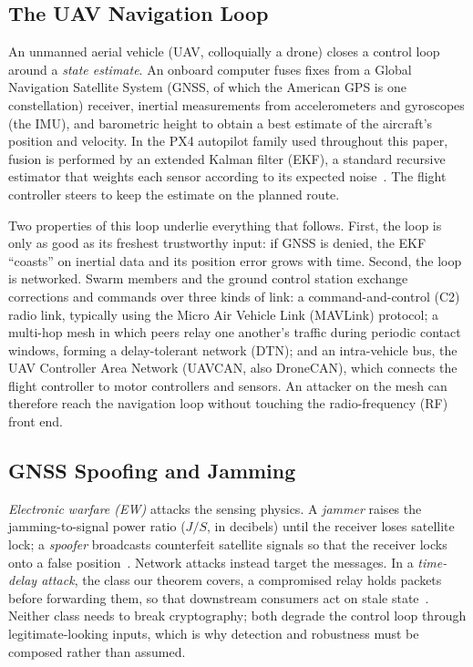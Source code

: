 \subsection{The UAV Navigation Loop}
An unmanned aerial vehicle (UAV, colloquially a drone) closes a control loop
around a \emph{state estimate}. An onboard computer fuses fixes from a Global
Navigation Satellite System (GNSS, of which the American GPS is one
constellation) receiver, inertial measurements from accelerometers and
gyroscopes (the IMU), and barometric height to obtain a best estimate of the
aircraft's position and velocity. In the PX4 autopilot family used throughout
this paper, fusion is performed by an extended Kalman filter (EKF), a standard
recursive estimator that weights each sensor according to its expected
noise~\cite{kong2024px4ekf}. The flight controller steers to keep the
estimate on the planned route.

Two properties of this loop underlie everything that follows. First, the loop is
only as good as its freshest trustworthy input: if GNSS is denied, the EKF
``coasts'' on inertial data and its position error grows with time. Second, the
loop is networked. Swarm members and the ground control station exchange
corrections and commands over three kinds of link: a command-and-control (C2) radio link,
typically using the Micro Air Vehicle Link (MAVLink) protocol; a multi-hop mesh
in which peers relay one another's traffic during periodic contact windows,
forming a delay-tolerant network (DTN); and an intra-vehicle bus, the UAV
Controller Area Network (UAVCAN, also DroneCAN), which connects the flight
controller to motor controllers and sensors. An attacker on the mesh can
therefore reach the navigation loop without touching the radio-frequency (RF)
front end.

\subsection{GNSS Spoofing and Jamming}
\emph{Electronic warfare (EW)} attacks the sensing physics. A \emph{jammer}
raises the jamming-to-signal power ratio ($J/S$, in decibels) until the
receiver loses satellite lock; a \emph{spoofer} broadcasts counterfeit satellite
signals so that the receiver locks onto a false
position~\cite{humphreys2008assessing,kerns2014capture}. Network attacks
instead target the messages. In a \emph{time-delay attack}, the class our
theorem covers, a compromised relay holds packets before forwarding them, so
that downstream consumers act on stale state~\cite{lou2019timedelay,datamut2026}.
Neither class needs to break cryptography; both degrade the control loop through
legitimate-looking inputs, which is why detection and robustness must be
composed rather than assumed.

